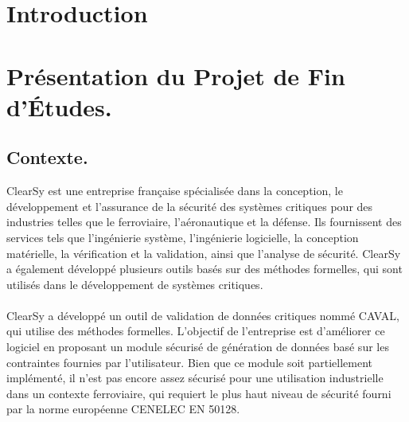 \documentclass[init,francais]{rapportPFE}  %
\begin{document}
\begin{ResumeMotsCles}
\end{ResumeMotsCles}








\tableofcontents


\section{Introduction}

\section{Présentation du Projet de Fin d'Études.}
\subsection{Contexte.}
ClearSy est une entreprise française spécialisée dans la conception, le développement et l'assurance de la sécurité des systèmes critiques pour des industries telles que le ferroviaire, l'aéronautique et la défense. Ils fournissent des services tels que l'ingénierie système, l'ingénierie logicielle, la conception matérielle, la vérification et la validation, ainsi que l'analyse de sécurité. ClearSy a également développé plusieurs outils basés sur des méthodes formelles, qui sont utilisés dans le développement de systèmes critiques.
\\~\\
ClearSy a développé un outil de validation de données critiques nommé CAVAL, qui utilise des méthodes formelles. L'objectif de l'entreprise est d'améliorer ce logiciel en proposant un module sécurisé de génération de données basé sur les contraintes fournies par l'utilisateur. Bien que ce module soit partiellement implémenté, il n'est pas encore assez sécurisé pour une utilisation industrielle dans un contexte ferroviaire, qui requiert le plus haut niveau de sécurité fourni par la norme européenne CENELEC EN 50128.
\end{document}
